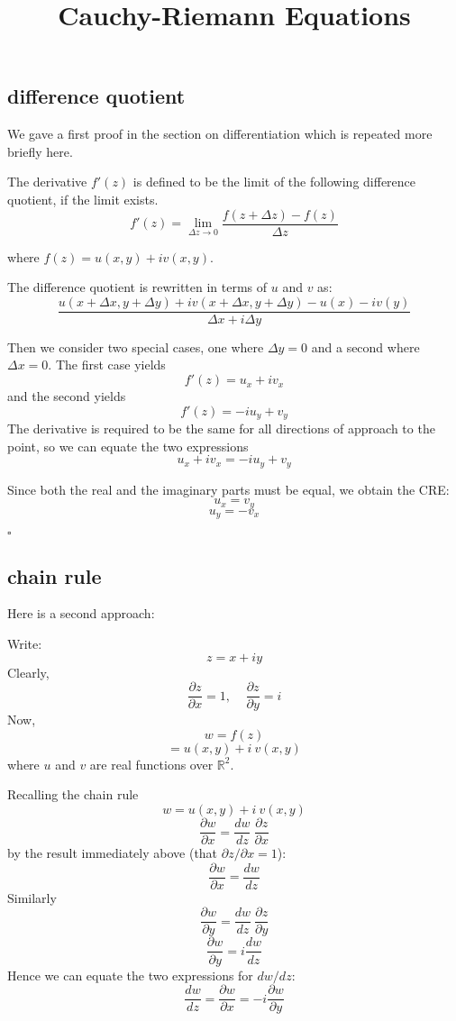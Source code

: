 \documentclass[11pt, oneside]{article}
\title{Cauchy-Riemann Equations}
\date{}
\begin{document}
\maketitle
\Large


\subsection*{difference quotient}

We gave a first proof in the section on differentiation which is repeated more briefly here.  

The derivative $f'(z)$ is defined to be the limit of the following difference quotient, if the limit exists.
\[ f'(z) = \lim_{\Delta z \rightarrow 0} \frac{f(z + \Delta z) - f(z)}{\Delta z} \]

where $f(z) = u(x,y) + i v(x,y)$.

The difference quotient is rewritten in terms of $u$ and $v$ as:
\[ \frac{u(x + \Delta x, y + \Delta y) + i v(x + \Delta x, y + \Delta y) - u(x) - i v(y)}{\Delta x + i \Delta y} \]

Then we consider two special cases, one where $\Delta y = 0$ and a second where $\Delta x = 0$.  The first case yields
\[ f'(z) = u_x + i v_x \]
and the second yields
\[ f'(z) = -i u_y + v_y \]
The derivative is required to be the same for all directions of approach to the point, so we can equate the two expressions
\[ u_x + i v_x = -i u_y + v_y \]

Since both the real and the imaginary parts must be equal, we obtain the CRE:
\[ u_x = v_y \]
\[ u_y = - v_x \]

$\square$

\subsection*{chain rule}
Here is a second approach:

Write:
\[ z = x + iy \]
Clearly,
\[ \frac{\partial z}{\partial x} = 1,  \ \ \ \ \  \frac{\partial z}{\partial y} = i \]
Now,
\[ w = f(z) \]
\[ = u(x,y) + i \ v(x,y) \]
where $u$ and $v$ are real functions over $\mathbb{R}^2$.

Recalling the chain rule
\[ w = u(x,y) + i \ v(x,y) \]
\[ \frac{\partial w}{\partial x} = \frac{dw}{dz} \ \frac{\partial z}{\partial x} \]
by the result immediately above (that $\partial z/\partial x = 1$):
\[ \frac{\partial w}{\partial x} =  \frac{dw}{dz} \]
Similarly
\[ \frac{\partial w}{\partial y} = \frac{dw}{dz} \ \frac{\partial z}{\partial y} \]
\[ \frac{\partial w}{\partial y} =  i \frac{dw}{dz} \]
Hence we can equate the two expressions for $dw/dz$:
\[ \frac{dw}{dz} = \frac{\partial w}{\partial x} = -i \frac{\partial w}{\partial y} \]
\end{document}
